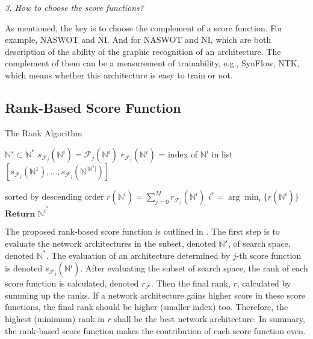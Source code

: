 \documentclass[sigconf]{acmart}
\begin{document}
    \textit{3. How to choose the score functions?}

    As mentioned, the key is to choose the complement of a score function. For example, 
    NASWOT and NI. And for NASWOT and NI, which are both description of the ability of 
    the graphic recognition of an architecture. The complement of them can be a measurement 
    of trainability, e.g., SynFlow, NTK, which means whether this architecture is easy to 
    train or not. 

    \subsection{Rank-Based Score Function}
    \begin{algorithm}[h]
        \caption{The Rank Algorithm}\label{alg:rank-based}
        \begin{algorithmic}[1]
            \Input ${\mathbb N}^{s}\subset{\mathbb N}^{*}$
                    \State $s_{{\mathcal F}_{j}}({\mathbb N}^i)={\mathcal F}_{j}({\mathbb N}^i)$
                \EndFor
            \EndFor
                \State $r_{{\mathcal F}_{j}}({\mathbb N}^i)$ = index of ${\mathbb N}^i$ in list $[s_{{\mathcal F}_{j}}({\mathbb N}^1),\ldots,s_{{\mathcal F}_{j}}({\mathbb N}^{\lvert {\mathbb N}^s\rvert})]$ \par sorted by descending order
            \EndFor
            \State $r({\mathbb N}^i)=\sum^M_{j=0} r_{{\mathcal F}_{j}}({\mathbb N}^i)$
            \State $i^*=\arg\min_{i}\{r({\mathbb N}^i)\}$
            \State $\textbf{Return }{\mathbb N}^{i^*}$
        \end{algorithmic}
    \end{algorithm}

    The proposed rank-based score function is outlined in . The first step is to evaluate the 
    network architectures in the subset, denoted $\mathbb N^s$, of search space, denoted $\mathbb N^*$. The evaluation 
    of an architecture determined by $j$-th score function is denoted $s_{\mathcal F_j}(\mathbb N^i)$. After evaluating 
    the subset of search space, the rank of each score function is calculated, denoted $r_{\mathcal F}$. Then the final 
    rank, $r$, calculated by summing up the ranks. 
    If a network architecture gains higher score in these score functions, the final rank should be higher (smaller index) too. 
    Therefore, the highest (minimum) rank in $r$ shall be the best network architecture. In summary, the rank-based score 
    function makes the contribution of each score function even. 
\end{document}
